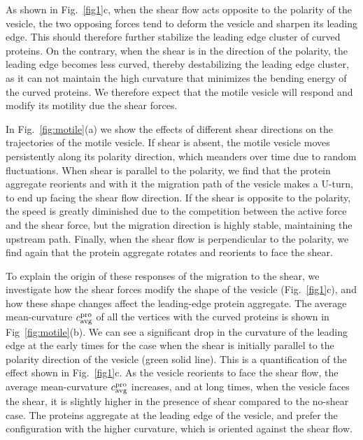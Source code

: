 \documentclass[
reprint,
superscriptaddress,
 amsmath,amssymb,
 aps,
prl,
floatfix]{revtex4-2}
\begin{document}
As shown in Fig.~\ref{fig1}c, when the shear flow acts opposite to the polarity of the vesicle, the two opposing forces tend to deform the vesicle and sharpen its leading edge. This should therefore further stabilize the leading edge cluster of curved proteins. On the contrary, when the shear is in the direction of the polarity, the leading edge becomes less curved, thereby destabilizing the leading edge cluster, as it can not maintain the high curvature that minimizes the bending energy of the curved proteins. We therefore expect that the motile vesicle will respond and modify its motility due the shear forces.

In Fig.~\ref{fig:motile}(a) we show the effects of different shear directions on the trajectories of the motile vesicle. If shear is absent, the motile vesicle moves persistently along its polarity direction, which meanders over time due to random fluctuations. When shear is parallel to the polarity, we find that the protein aggregate reorients and with it the migration path of the vesicle makes a U-turn, to end up facing the shear flow direction. If the shear is opposite to the polarity, the speed is greatly diminished due to the competition between the active force and the shear force, but the migration direction is highly stable, maintaining the upstream path. Finally, when the shear flow is perpendicular to the polarity, we find again that the protein aggregate rotates and reorients to face the shear. 

To explain the origin of these responses of the migration to the shear, we investigate how the shear forces modify the shape of the vesicle (Fig.~\ref{fig1}c), and how these shape changes affect the leading-edge protein aggregate. The average mean-curvature $c^{\rm pro}_{\rm avg}$ of all the vertices with the curved proteins is shown in Fig~\ref{fig:motile}(b). We can see a significant drop in the curvature of the leading edge at the early times for the case when the shear is initially parallel to the polarity direction of the vesicle (green solid line). This is a quantification of the effect shown in Fig.~\ref{fig1}c. As the vesicle reorients to face the shear flow, the average mean-curvature $c^{\rm pro}_{\rm avg}$ increases, and at long times, when the vesicle faces the shear, it is slightly higher in the presence of shear compared to the no-shear case. The proteins aggregate at the leading edge of the vesicle, and prefer the configuration with the higher curvature, which is oriented against the shear flow. 
\end{document}
